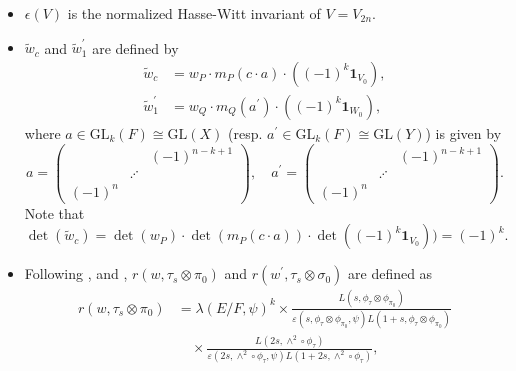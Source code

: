 \documentclass[article]{article}
\numberwithin{equation}{section}
\theoremstyle{definition}
\begin{document}
\begin{itemize}
 \item $\epsilon(V)$ is the normalized Hasse-Witt invariant of $V=V_{2n}$.  
\item $\widetilde{w}_{c}$ and $\widetilde{w}_1^{\prime}$ are defined by
\begin{equation}\label{131}
\begin{aligned}
\widetilde{w}_{c}&=w_{P} \cdot m_{P}\left(c \cdot a\right) \cdot\left((-1)^{k} \mathbf{1}_{V_0}\right),\\
\widetilde{w}_1^{\prime}&=w_{Q} \cdot m_{Q}\left( a^{\prime}\right) \cdot\left((-1)^k \mathbf{1}_{W_0}\right),
\end{aligned}
\end{equation}
where $a \in \mathrm{GL}_{k}(F) \cong \mathrm{GL}(X)$ (resp. $a^{\prime} \in \mathrm{GL}_{k}(F) \cong \mathrm{GL}(Y)$) is given by
$$
a=\left(\begin{array}{ccc}
{} &{}& (-1)^{n-k+1} \\ 
{} &{\iddots} & {}\\
{(-1)^n}&{}& {}
\end{array}\right), \quad 
a^{\prime}=\left(\begin{array}{ccc}
{} &{}& (-1)^{n-k+1} \\ 
{} &{\iddots} & {}\\
{(-1)^n}&{}& {}
\end{array}\right) .
$$
Note that  
\begin{equation}\label{determinantminus1}
\det(\widetilde{w}_{c})=\det(w_{P})\cdot \det\left(m_{P}(c \cdot a)\right)\cdot \det\left((-1)^{k} \mathbf{1}_{V_0}\right))=(-1)^{k}. 
\end{equation}
 \item  Following \cite{MR3135650}, \cite[\S 6.2]{MR3788848} and \cite[\S 3.7]{MR3708200}, $r\left(w, \tau_{s} \otimes \pi_0\right)$ and $r\left(w^{\prime}, \tau_{s} \otimes \sigma_0\right)$ are 
    defined as 
    \begin{equation}\label{normalizationfactor}
	\begin{aligned}
	r\left(w, \tau_{s} \otimes \pi_0\right)&=\lambda(E / F, \psi)^{k}\times \frac{L\left(s, \phi_{\tau} \otimes \phi_{\pi_0}\right)}{\varepsilon\left(s, \phi_{\tau} \otimes \phi_{\pi_0}, \psi\right) L\left(1+s, \phi_{\tau} \otimes \phi_{\pi_0}\right)}\\ 
	&\quad \times \frac{L\left(2 s, \wedge^{2} \circ \phi_{\tau}\right)}{\varepsilon\left(2 s, \wedge^{2} \circ \phi_{\tau}, \psi\right) L\left(1+2 s, \wedge^{2} \circ \phi_{\tau}\right)},\\

\end{aligned}
\end{equation}
\end{itemize}
\end{document}

